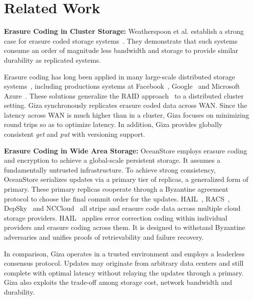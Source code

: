 \section{Related Work}


{\bf Erasure Coding in Cluster Storage:}
Weatherspoon et al. establish a strong case for erasure coded storage
systems~\cite{weatherspoon02erasure}. They demonstrate that such systems consume
an order of magnitude less bandwidth and storage to provide similar durability
as replicated systems.

Erasure coding has long been applied in many large-scale distributed storage
systems~\cite{fab:asplos04, zhang04repstore, haeberlen05glacier, abd05ursa,
  welch08scalable, sathiamoorthy13xoring, zhang16efficient}, including
productions systems at Facebook~\cite{borthakur2010hdfs},
Google~\cite{fikes2010storage, ford10availability} and Microsoft
Azure~\cite{huang12erasure}. These solutions generalize the RAID
approach~\cite{patterson88case, wilkes96hp} to a distributed cluster setting.
Giza synchronously replicates erasure coded data across WAN. Since the latency
across WAN is much higher than in a cluster, Giza focuses on minimizing round
trips so as to optimize latency. In addition, Giza provides globally consistent
{\em get} and {\em put} with versioning support.

{\bf Erasure Coding in Wide Area Storage:}
OceanStore \cite{oceanstore:asplos00, pond:fast03} employs erasure coding and
encryption to achieve a global-scale persistent storage. It assumes a
fundamentally untrusted infrastructure. To achieve strong consistency,
OceanStore serializes updates via a primary tier of replicas, a generalized form
of primary. These primary replicas cooperate through a Byzantine agreement
protocol to choose the final commit order for the updates. 
HAIL~\cite{hail:ccs09}, RACS~\cite{racs:socc10}, DepSky~\cite{depsky:eurosys11} and
NCCloud~\cite{nccloud:fast12} all stripe and erasure code data across multiple
cloud storage providers. HAIL~\cite{hail:ccs09} applies error correction coding
within individual providers and erasure coding across them. It is designed to
withstand Byzantine adversaries and unifies proofs of retrievability and failure
recovery. 

In comparison, Giza operates in a trusted environment and employs a
leaderless consensus protocol. Updates may originate from arbitrary data centers
and still complete with optimal latency without relaying the updates through a primary. Giza also exploits the trade-off among storage
cost, network bandwidth and durability.

